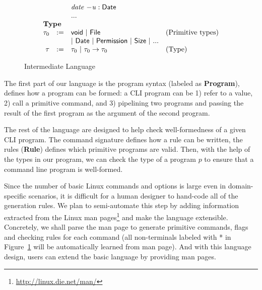 \begin{figure}
\[\begin{array}{rlll}
                  &  & \mathit{date}~\mathit{-u} : \mathsf{Date}\\
                  &  & ...\\
\multicolumn{3}{l}{\textbf{Type}}\\
\tau_0 & := & \mathsf{void} ~|~ \mathsf{File} & \textrm{(Primitive types)}\\
       &     & |~ \mathsf{Date} ~|~ \mathsf{Permission} ~|~ \mathsf{Size} ~|~ ... \\
\tau & := & \tau_0 ~|~ \tau_0\rightarrow \tau_0 & \textrm{(Type)}
\end{array}
\]
\caption{Intermediate Language}
\label{fig:lang}
\end{figure}


The first part of our language is the program syntax (labeled as \textbf{Program}), defines how a program can be formed: a CLI program can be 1) refer to a value, 2) call a primitive command, and 3) pipelining two programs and passing the result of the first program as the argument of the second program.

The rest of the language are designed to help check well-formedness of a given CLI program. The command signature defines how a rule can be written, the rules (\textbf{Rule}) defines which primitive programs are valid. Then, with the help of the types in our program, we can check the type of a program $p$ to ensure that a command line program is well-formed.

Since the number of basic Linux commands and options is large even in domain-specific scenarios, it is difficult for a human designer to hand-code all of the generation rules. We plan to semi-automate this step by adding information extracted from the Linux man pages\footnote{\url{http://linux.die.net/man/}} and make the language extensible. Concretely, we shall parse the man page to generate primitive commands, flags and checking rules for each command (all non-terminals labeled with * in Figure~\ref{fig:lang} will be automatically learned from man page). And with this language design, users can extend the basic language by providing man pages.

